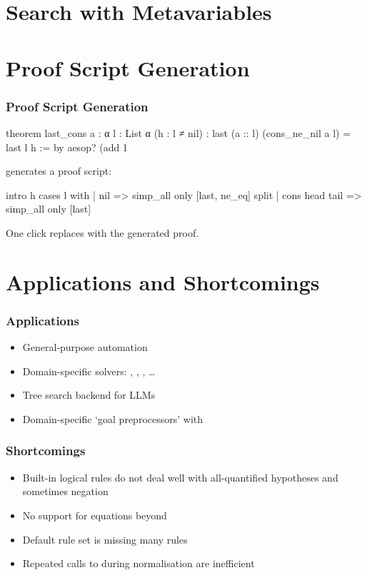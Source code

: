 \documentclass[xetex]{beamer}
\begin{document}
\section{Search with Metavariables}


\section{Proof Script Generation}

\begin{frame}[fragile]
  \frametitle{Proof Script Generation}

  \begin{leancode}
    theorem last_cons {a : α} {l : List α} (h : l ≠ nil) :
        last (a :: l) (cons_ne_nil a l) = last l h := by
      aesop? (add 1%
  \end{leancode}

  \pause

   generates a proof script:

  \begin{leancode}
    intro h
    cases l with
    | nil =>
      simp_all only [last, ne_eq]
      split
    | cons head tail => simp_all only [last]
  \end{leancode}

  One click replaces  with the generated proof.
\end{frame}

\section{Applications and Shortcomings}

\begin{frame}
  \frametitle{Applications}

  \begin{itemize}[<+->]
    \item General-purpose automation
    \item Domain-specific solvers: , , , \dots
    \item Tree search backend for LLMs
    \item Domain-specific \enquote*{goal preprocessors} with 
  \end{itemize}
\end{frame}

\begin{frame}
  \frametitle{Shortcomings}

  \begin{itemize}[<+->]
    \item Built-in logical rules do not deal well with all-quantified hypotheses and sometimes negation
    \item No support for equations beyond 
    \item Default rule set is missing many rules
    \item Repeated calls to  during normalisation are inefficient
  \end{itemize}
\end{frame}
\end{document}
